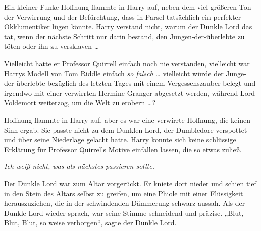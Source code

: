 Ein kleiner Funke Hoffnung flammte in Harry auf, neben dem viel größeren Ton der Verwirrung und der Befürchtung, dass in Parsel tatsächlich ein perfekter Okklumentiker lügen könnte. Harry verstand nicht, warum der Dunkle Lord das tat, wenn der nächste Schritt nur darin bestand, den Jungen-der-überlebte zu töten oder ihn zu versklaven …

Vielleicht hatte er Professor Quirrell einfach noch nie verstanden, vielleicht war Harrys Modell von Tom Riddle einfach \emph{so falsch} … vielleicht würde der Junge-der-überlebte bezüglich des letzten Tages mit einem Vergessenszauber belegt und irgendwo mit einer verwirrten Hermine Granger abgesetzt werden, während Lord Voldemort weiterzog, um die Welt zu erobern …?

Hoffnung flammte in Harry auf, aber es war eine verwirrte Hoffnung, die keinen Sinn ergab. Sie passte nicht zu dem Dunklen Lord, der Dumbledore verspottet und über seine Niederlage gelacht hatte. Harry konnte sich keine schlüssige Erklärung für Professor Quirrells Motive einfallen lassen, die so etwas zuließ.

\emph{Ich weiß nicht, was als nächstes passieren sollte.}

Der Dunkle Lord war zum Altar vorgerückt. Er kniete dort nieder und schien tief in den Stein des Altars selbst zu greifen, um eine Phiole mit einer Flüssigkeit herauszuziehen, die in der schwindenden Dämmerung schwarz aussah.
Als der Dunkle Lord wieder sprach, war seine Stimme schneidend und präzise.
„Blut, Blut, Blut, so weise verborgen“, sagte der Dunkle Lord.

